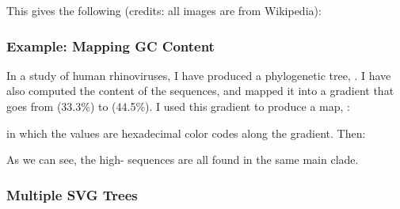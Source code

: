 
This gives the following (credits: all images are from Wikipedia):


\subsubsection[sct_display_ornament_xpl_gc]{Example: Mapping GC Content}

 In a study of human rhinoviruses, I have produced a phylogenetic tree,
 . I have also computed the \gc{} content of the sequences,
 and mapped it into a gradient that goes from \color[blue]{blue} (33.3\%) to
\color[red]{red} (44.5\%). I used this gradient to produce a \css{} map,
:


\noindent{}in which the  values are hexadecimal color codes along
the gradient. Then:


\bigskip{}

\noindent{}As we can see, the high-\gc{} sequences are all found in the same
main clade.

\subsubsection{Multiple SVG Trees}

